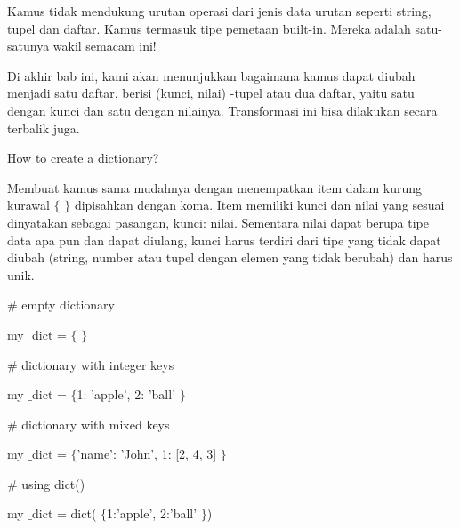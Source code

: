 \vspace{12pt}
\noindent 
Kamus tidak mendukung urutan operasi dari jenis data urutan seperti string, tupel dan daftar. Kamus termasuk tipe pemetaan built-in. Mereka adalah satu-satunya wakil semacam ini! \par
\vspace{12pt}
\noindent 
Di akhir bab ini, kami akan menunjukkan bagaimana kamus dapat diubah menjadi satu daftar, berisi (kunci, nilai) -tupel atau dua daftar, yaitu satu dengan kunci dan satu dengan nilainya. Transformasi ini bisa dilakukan secara terbalik juga. \par
\vspace{12pt}
\noindent 
How to create a dictionary? \par
\noindent 
Membuat kamus sama mudahnya dengan menempatkan item dalam kurung kurawal  $  \{  $ $  \}  $ dipisahkan dengan koma. Item memiliki kunci dan nilai yang sesuai dinyatakan sebagai pasangan, kunci: nilai. Sementara nilai dapat berupa tipe data apa pun dan dapat diulang, kunci harus terdiri dari tipe yang tidak dapat diubah (string, number atau tupel dengan elemen yang tidak berubah) dan harus unik. \par
\noindent 
 \hspace*{0.5in}  $  \#  $ empty dictionary \par
\noindent 
 \hspace*{0.5in} my $  \_  $dict =  $  \{  $ $  \}  $ \par
\vspace{12pt}
\noindent 
 \hspace*{0.5in}  $  \#  $ dictionary with integer keys \par
\noindent 
 \hspace*{0.5in} my $  \_  $dict =  $  \{  $1: 'apple', 2: 'ball' $  \}  $ \par
\vspace{12pt}
\noindent 
 \hspace*{0.5in}  $  \#  $ dictionary with mixed keys \par
\noindent 
 \hspace*{0.5in} my $  \_  $dict =  $  \{  $'name': 'John', 1: [2, 4, 3] $  \}  $ \par
\vspace{12pt}
\noindent 
 \hspace*{0.5in}  $  \#  $ using dict() \par
\noindent 
 \hspace*{0.5in} my $  \_  $dict = dict( $  \{  $1:'apple', 2:'ball' $  \}  $) \par

